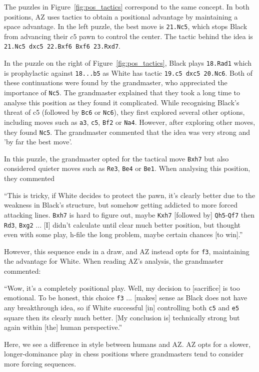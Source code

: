 \documentclass{article}
\newcommand{\ct}[1]{\texttt{#1}}
\begin{document}
The puzzles in Figure~\ref{fig:pos_tactics} correspond to the same concept. In both positions, AZ uses tactics to obtain a positional advantage by maintaining a space advantage.
In the left puzzle, the best move is \ct{21.Nc5}, which stops Black from advancing their $c5$ pawn to control the center. The tactic behind the idea is \ct{21.Nc5 dxc5 22.Bxf6 Bxf6 23.Rxd7}.


In the puzzle on the right of Figure~\ref{fig:pos_tactics}, Black plays \ct{18.Rad1} which is prophylactic against \ct{18...b5} as White has tactic \ct{19.c5 dxc5 20.Nc6}.
Both of these continuations were found by the grandmaster, who appreciated the importance of \ct{Nc5}.
The grandmaster explained that they took a long time to analyse this position as they found it complicated. While recognising Black's threat of c5 (followed by \ct{Bc6} or \ct{Nc6}), they first explored several other options, including moves such as \ct{a3}, \ct{c5}, \ct{Bf2} or \ct{Na4}. However, after exploring other moves, they found \ct{Nc5}. The grandmaster commented that the idea was very strong and 'by far the best move'. 

In this puzzle, the grandmaster opted for the tactical move \ct{Bxh7} but also considered quieter moves such as \ct{Re3}, \ct{Be4} or \ct{Be1}. When analysing this position, they commented 
\begin{displayquote}
``This is tricky, if White decides to protect the pawn, it's clearly better due to the weakness in Black’s structure, but somehow getting addicted to
more forced attacking lines. \ct{Bxh7} is hard to figure out, maybe \ct{Kxh7} [followed by] \ct{Qh5}-\ct{Qf7} then \ct{Rd3}, \ct{Bxg2} ... [I] didn’t calculate until clear much better position, but thought even with some play, h-file the long problem, maybe certain chances [to win].''
\end{displayquote}
However, this sequence ends in a draw, and AZ instead opts for \ct{f3}, maintaining the advantage for White. When reading AZ's analysis, the grandmaster commented:
\begin{displayquote}
``Wow, it’s a completely positional play. Well, my decision to [sacrifice] is too emotional. To be honest, this choice \ct{f3} ... [makes] sense as Black does not have any breakthrough idea, so if White successful [in] controlling both \ct{c5} and \ct{e5} square then its clearly much better. [My conclusion is] technically strong but again within [the] human perspective.''
\end{displayquote}
Here, we see a difference in style between humans and AZ. AZ opts for a slower, longer-dominance play in chess positions where grandmasters tend to consider more forcing sequences. 
\end{document}
